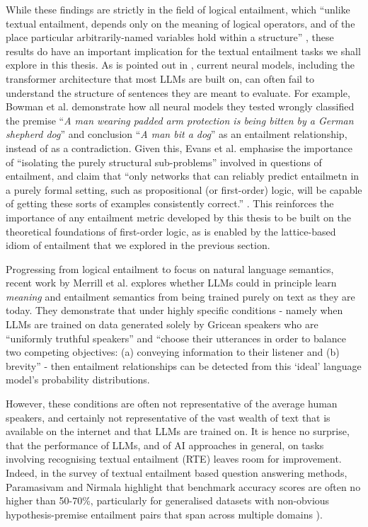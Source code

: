 \documentclass[12pt,twoside]{report}
\begin{document}
While these findings are strictly in the field of logical entailment, which ``unlike textual entailment, depends only on the meaning of logical operators, and of the place particular arbitrarily-named variables hold within a structure'' \cite{Evans2018}, these results do have an important implication for the textual entailment tasks we shall explore in this thesis. As is pointed out in \cite{Evans2018}, current neural models, including the transformer architecture that most LLMs are built on, can often fail to understand the structure of sentences they are meant to evaluate. For example, Bowman et al. \cite{bowman2015} demonstrate how all neural models they tested wrongly classified the premise ``\textit{A man wearing padded arm protection is being bitten by a German shepherd dog}'' and conclusion ``\textit{A man bit a dog}'' as an entailment relationship, instead of as a contradiction. Given this, Evans et al. emphasise the importance of ``isolating the purely structural sub-problems'' involved in questions of entailment, and claim that ``only networks that can reliably predict entailmetn in a purely formal setting, such as propositional (or first-order) logic, will be capable of getting these sorts of examples consistently correct.'' \cite{Evans2018}. This reinforces the importance of any entailment metric developed by this thesis to be built on the theoretical foundations of first-order logic, as is enabled by the lattice-based idiom of entailment that we explored in the previous section. \newline \par

Progressing from logical entailment to focus on natural language semantics, recent work by Merrill et al. \cite{merrill-etal-2022-entailment} explores whether LLMs could in principle learn \textit{meaning} and entailment semantics from being trained purely on text as they are today. They demonstrate that under highly specific conditions - namely when LLMs are trained on data generated solely by Gricean speakers who are ``uniformly truthful speakers'' and ``choose their utterances in order to balance two competing objectives: (a) conveying information to their listener and (b) brevity'' - then entailment relationships can be detected from this `ideal' language model's probability distributions. \newline \par

However, these conditions are often not representative of the average human speakers, and certainly not representative of the vast wealth of text that is available on the internet and that LLMs are trained on. It is hence no surprise, that the performance of LLMs, and of AI approaches in general, on tasks involving recognising textual entailment (RTE) leaves room for improvement. Indeed, in the survey of textual entailment based question answering methods, Paramasivam and Nirmala highlight that benchmark accuracy scores are often no higher than 50-70\%, particularly for generalised datasets with non-obvious hypothesis-premise entailment pairs that span across multiple domains \cite{PARAMASIVAM20229644}). 
\end{document}
